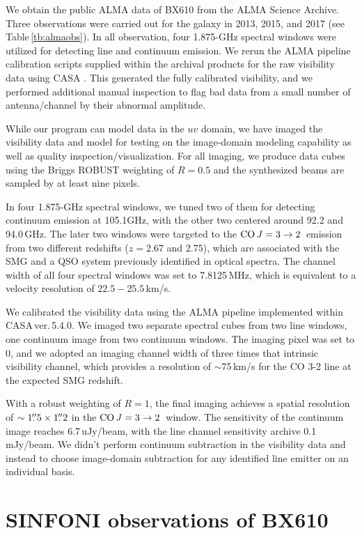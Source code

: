 \documentclass[twocolumn,tighten]{aastex62}
\newcommand{\cothree}{\mbox{${\rm CO\,{\it J}=3\to2}$}}
\begin{document}
We obtain the public ALMA data of BX610 from the ALMA Science Archive.
Three observations were carried out for the galaxy in 2013, 2015, and 2017 (see Table\,\ref{tb:almaobs}).
In all observation, four 1.875-GHz spectral windows were utilized for detecting line and continuum emission.
We rerun the ALMA pipeline calibration scripts supplied within the archival products for the raw visibility data using CASA \citep{McMullin:2007ta}. 
This generated the fully calibrated visibility, and we performed additional manual inspection to flag bad data from a small number of antenna/channel by their abnormal amplitude.

While our program can model data in the $uv$ domain, we have imaged the visibility data and model for testing on the image-domain modeling capability as well as quality inspection/visualization.
For all imaging, we produce data cubes using the Briggs ROBUST weighting of $R=0.5$ and the synthesized beams are sampled by at least nine pixels.


In four 1.875-GHz spectral windows, we tuned two of them for detecting continuum emission at 105.1GHz, with the other two centered around 92.2 and 94.0\,GHz. 
The later two windows were targeted to the \cothree\ emission from two different redshifts ($z=2.67$ and $2.75$), which are associated with the SMG and a QSO system previously identified in optical spectra.
The channel width of all four spectral windows was set to 7.8125\,MHz, which is equivalent to a velocity resolution of $22.5-25.5$\,km/s.

We calibrated the visibility data using the ALMA pipeline implemented within CASA\,ver.\,5.4.0.
We imaged two separate spectral cubes from two line windows, one continuum image from two continuum windows.
The imaging pixel was set to 0, and we adopted an imaging channel width of three times that intrinsic visibility channel, which provides a resolution of $\sim$75\,km/s for the CO 3-2 line at the expected SMG redshift.

With a robust weighting of $R=1$, the final imaging achieves a spatial resolution of $\sim1\mbox{$.\!\!^{\prime\prime}$}5\times1\mbox{$.\!\!^{\prime\prime}$}2$ in the \cothree\ window. The sensitivity of the continuum image reaches 6.7\,uJy/beam, with the line channel sensitivity archive 0.1\,mJy/beam.
We didn't perform continuum subtraction in the visibility data and instead to choose image-domain subtraction for any identified line emitter on an individual basis.



\section{SINFONI observations of BX610}
\end{document}
